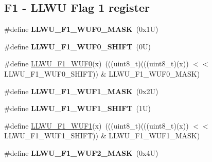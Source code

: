 \subsection*{F1 -\/ L\+L\+WU Flag 1 register}
\begin{DoxyCompactItemize}
\item 
\mbox{\label{group___l_l_w_u___register___masks_ga1308a2e0d967a81b7fc32af6816cb532}} 
\#define {\bfseries L\+L\+W\+U\+\_\+\+F1\+\_\+\+W\+U\+F0\+\_\+\+M\+A\+SK}~(0x1\+U)
\item 
\mbox{\label{group___l_l_w_u___register___masks_ga6a004e1e5a54356cf5b70d9f17b96afc}} 
\#define {\bfseries L\+L\+W\+U\+\_\+\+F1\+\_\+\+W\+U\+F0\+\_\+\+S\+H\+I\+FT}~(0\+U)
\item 
\#define \mbox{\hyperlink{group___l_l_w_u___register___masks_gadf947a1640b0c6ac4e501aec5b935154}{L\+L\+W\+U\+\_\+\+F1\+\_\+\+W\+U\+F0}}(x)~(((uint8\+\_\+t)(((uint8\+\_\+t)(x)) $<$$<$ L\+L\+W\+U\+\_\+\+F1\+\_\+\+W\+U\+F0\+\_\+\+S\+H\+I\+FT)) \& L\+L\+W\+U\+\_\+\+F1\+\_\+\+W\+U\+F0\+\_\+\+M\+A\+SK)
\item 
\mbox{\label{group___l_l_w_u___register___masks_ga3513d59cf672e1dfd8884672b57c879b}} 
\#define {\bfseries L\+L\+W\+U\+\_\+\+F1\+\_\+\+W\+U\+F1\+\_\+\+M\+A\+SK}~(0x2\+U)
\item 
\mbox{\label{group___l_l_w_u___register___masks_gadfac3bafc6a624b27f059e3d9cf3a899}} 
\#define {\bfseries L\+L\+W\+U\+\_\+\+F1\+\_\+\+W\+U\+F1\+\_\+\+S\+H\+I\+FT}~(1\+U)
\item 
\#define \mbox{\hyperlink{group___l_l_w_u___register___masks_ga550c62884c90b1a85c2fa07d1bfdcd48}{L\+L\+W\+U\+\_\+\+F1\+\_\+\+W\+U\+F1}}(x)~(((uint8\+\_\+t)(((uint8\+\_\+t)(x)) $<$$<$ L\+L\+W\+U\+\_\+\+F1\+\_\+\+W\+U\+F1\+\_\+\+S\+H\+I\+FT)) \& L\+L\+W\+U\+\_\+\+F1\+\_\+\+W\+U\+F1\+\_\+\+M\+A\+SK)
\item 
\mbox{\label{group___l_l_w_u___register___masks_gabc46629018d0f2eb7a39896eb5225933}} 
\#define {\bfseries L\+L\+W\+U\+\_\+\+F1\+\_\+\+W\+U\+F2\+\_\+\+M\+A\+SK}~(0x4\+U)
\item 
\mbox{\label{group___l_l_w_u___register___masks_gab99e1778fd26ccd69f31a56d94709e41}} 

\end{DoxyCompactItemize}

